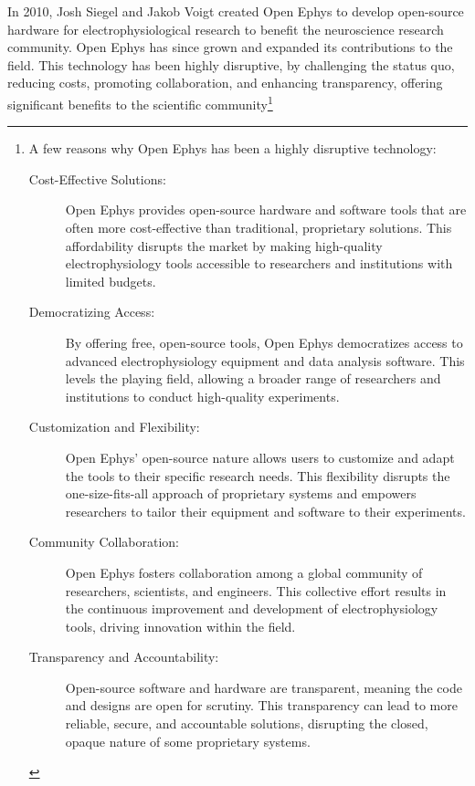 In 2010, Josh Siegel and Jakob Voigt created Open Ephys to develop open-source
hardware for electrophysiological research to benefit the neuroscience research
community.  Open Ephys has since grown and expanded its contributions to the
field. This technology has been highly disruptive, by challenging the status
quo, reducing costs, promoting collaboration, and enhancing transparency,
offering significant benefits to the scientific community\footnote{

A few reasons why Open Ephys has been a highly disruptive technology:


\begin{description}

	\item[Cost-Effective Solutions:] Open Ephys provides open-source hardware and software tools that are often more cost-effective than traditional, proprietary solutions. This affordability disrupts the market by making high-quality electrophysiology tools accessible to researchers and institutions with limited budgets.

	\item[Democratizing Access:] By offering free, open-source tools, Open Ephys democratizes access to advanced electrophysiology equipment and data analysis software. This levels the playing field, allowing a broader range of researchers and institutions to conduct high-quality experiments.

	\item[Customization and Flexibility:] Open Ephys' open-source nature allows users to customize and adapt the tools to their specific research needs. This flexibility disrupts the one-size-fits-all approach of proprietary systems and empowers researchers to tailor their equipment and software to their experiments.

	\item[Community Collaboration:] Open Ephys fosters collaboration among a global community of researchers, scientists, and engineers. This collective effort results in the continuous improvement and development of electrophysiology tools, driving innovation within the field.

	\item[Transparency and Accountability:] Open-source software and hardware are transparent, meaning the code and designs are open for scrutiny. This transparency can lead to more reliable, secure, and accountable solutions, disrupting the closed, opaque nature of some proprietary systems.


\end{description}}
